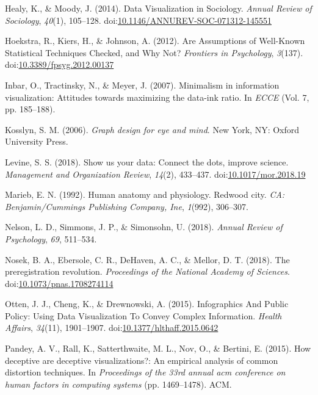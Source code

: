 \documentclass[
  man]{apa6}
\begin{document}
\leavevmode\hypertarget{ref-Healy2014a}{}%
Healy, K., \& Moody, J. (2014). Data Visualization in Sociology. \emph{Annual Review of Sociology}, \emph{40}(1), 105--128. doi:\href{https://doi.org/10.1146/ANNUREV-SOC-071312-145551}{10.1146/ANNUREV-SOC-071312-145551}

\leavevmode\hypertarget{ref-hoekstra_are_2012}{}%
Hoekstra, R., Kiers, H., \& Johnson, A. (2012). Are Assumptions of Well-Known Statistical Techniques Checked, and Why Not? \emph{Frontiers in Psychology}, \emph{3}(137). doi:\href{https://doi.org/10.3389/fpsyg.2012.00137}{10.3389/fpsyg.2012.00137}

\leavevmode\hypertarget{ref-inbar2007minimalism}{}%
Inbar, O., Tractinsky, N., \& Meyer, J. (2007). Minimalism in information visualization: Attitudes towards maximizing the data-ink ratio. In \emph{ECCE} (Vol. 7, pp. 185--188).

\leavevmode\hypertarget{ref-Kosslyn2006e}{}%
Kosslyn, S. M. (2006). \emph{Graph design for eye and mind}. New York, NY: Oxford University Press.

\leavevmode\hypertarget{ref-Levine2018}{}%
Levine, S. S. (2018). Show us your data: Connect the dots, improve science. \emph{Management and Organization Review}, \emph{14}(2), 433--437. doi:\href{https://doi.org/10.1017/mor.2018.19}{10.1017/mor.2018.19}

\leavevmode\hypertarget{ref-marieb1992human}{}%
Marieb, E. N. (1992). Human anatomy and physiology. Redwood city. \emph{CA: Benjamin/Cummings Publishing Company, Ine}, \emph{1}(992), 306--307.

\leavevmode\hypertarget{ref-Nelson2018a}{}%
Nelson, L. D., Simmons, J. P., \& Simonsohn, U. (2018). \emph{Annual Review of Psychology}, \emph{69}, 511--534.

\leavevmode\hypertarget{ref-Nosek2018}{}%
Nosek, B. A., Ebersole, C. R., DeHaven, A. C., \& Mellor, D. T. (2018). The preregistration revolution. \emph{Proceedings of the National Academy of Sciences}. doi:\href{https://doi.org/10.1073/pnas.1708274114}{10.1073/pnas.1708274114}

\leavevmode\hypertarget{ref-Otten2015}{}%
Otten, J. J., Cheng, K., \& Drewnowski, A. (2015). Infographics And Public Policy: Using Data Visualization To Convey Complex Information. \emph{Health Affairs}, \emph{34}(11), 1901--1907. doi:\href{https://doi.org/10.1377/hlthaff.2015.0642}{10.1377/hlthaff.2015.0642}

\leavevmode\hypertarget{ref-pandey2015deceptive}{}%
Pandey, A. V., Rall, K., Satterthwaite, M. L., Nov, O., \& Bertini, E. (2015). How deceptive are deceptive visualizations?: An empirical analysis of common distortion techniques. In \emph{Proceedings of the 33rd annual acm conference on human factors in computing systems} (pp. 1469--1478). ACM.
\end{document}
